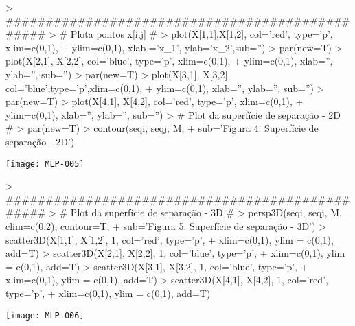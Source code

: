 \documentclass{article}
\begin{document}
\begin{Schunk}
\begin{Sinput}
> ################################################
> # Plota pontos x[i,j] #
> plot(X[1,1],X[1,2], col='red', type='p', xlim=c(0,1),
+      ylim=c(0,1), xlab ='x_1', ylab='x_2',sub='')
> par(new=T)
> plot(X[2,1], X[2,2], col='blue', type='p', xlim=c(0,1),
+      ylim=c(0,1), xlab='', ylab='', sub='')
> par(new=T)
> plot(X[3,1], X[3,2], col='blue',type='p',xlim=c(0,1),
+      ylim=c(0,1), xlab='', ylab='', sub='')
> par(new=T)
> plot(X[4,1], X[4,2], col='red', type='p', xlim=c(0,1),
+      ylim=c(0,1), xlab='', ylab='', sub='')
> # Plot da superfície de separação - 2D #
> par(new=T)
> contour(seqi, seqj, M,
+         sub='Figura 4: Superfície de separação - 2D')
\end{Sinput}
\end{Schunk}
\texttt{[image: MLP-005]}

\begin{Schunk}
\begin{Sinput}
> ################################################
> # Plot da superfície de separação - 3D #
> persp3D(seqi, seqj, M, clim=c(0,2), contour=T,
+         sub='Figura 5: Superfície de separação - 3D')
> scatter3D(X[1,1], X[1,2], 1, col='red', type='p', 
+           xlim=c(0,1), ylim = c(0,1), add=T)
> scatter3D(X[2,1], X[2,2], 1, col='blue', type='p', 
+           xlim=c(0,1), ylim = c(0,1), add=T)
> scatter3D(X[3,1], X[3,2], 1, col='blue', type='p', 
+           xlim=c(0,1), ylim = c(0,1), add=T)
> scatter3D(X[4,1], X[4,2], 1, col='red', type='p', 
+           xlim=c(0,1), ylim = c(0,1), add=T)
\end{Sinput}
\end{Schunk}
\texttt{[image: MLP-006]}
\end{document}
